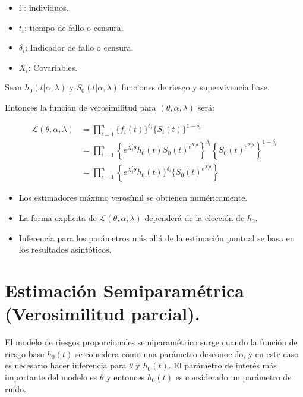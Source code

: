 \documentclass[
  a4paper,
  oneside,
  openany]{book}
\providecommand{\tightlist}{%
  \setlength{\itemsep}{0pt}\setlength{\parskip}{0pt}}
\begin{document}
\begin{itemize}
\tightlist
\item
  i : individuos.
\item
  \(t_i\): tiempo de fallo o censura.
\item
  \(\delta_i\): Indicador de fallo o censura.
\item
  \(X_i\): Covariables.
\end{itemize}

Sean \(h_0(t|\alpha, \lambda)\) y \(S_0(t|\alpha, \lambda)\) funciones de riesgo y supervivencia base.

Entonces la función de verosimilitud para \((\theta, \alpha, \lambda)\) será:

\[
\begin{split}
\mathscr{L}(\theta, \alpha, \lambda) & =\prod_{i = 1}^{n}\{f_i(t)\}^{\delta_{i}}\{S_i(t)\}^{1-\delta_{i}}\\
 & =\prod_{i = 1}^{n}\left\{e^{X_i^{'}\theta}h_0(t)S_0(t)^{e^{X_i^{'}\theta}}\right\}^{\delta_{i}}\left\{S_0(t)^{e^{X_i^{'}\theta}}\right\}^{1-\delta_i}\\
 & =\prod_{i = 1}^{n}\left\{e^{X_i^{'}\theta}h_0(t)\}^{\delta_{i}}\{S_0(t)^{e^{X_i^{'}\theta}}\right\}
\end{split}
\]

\begin{itemize}
\tightlist
\item
  Los estimadores máximo verosímil se obtienen numéricamente.
\item
  La forma explicita de \(\mathscr{L}(\theta, \alpha, \lambda)\) dependerá de la elección de \(h_0\).
\item
  Inferencia para los parámetros más allá de la estimación puntual se basa en los resultados asintóticos.
\end{itemize}

\hypertarget{estimaciuxf3n-semiparamuxe9trica-verosimilitud-parcial.}{%
\section{Estimación Semiparamétrica (Verosimilitud parcial).}\label{estimaciuxf3n-semiparamuxe9trica-verosimilitud-parcial.}}

El modelo de riesgos proporcionales semiparamétrico surge cuando la función de riesgo base \(h_0(t)\) se considera como una parámetro desconocido, y en este caso es necesario hacer inferencia para \(\theta\) y \(h_0(t)\). El parámetro de interés más importante del modelo es \(\theta\) y entonces \(h_0(t)\) es considerado un parámetro de ruido.
\end{document}
